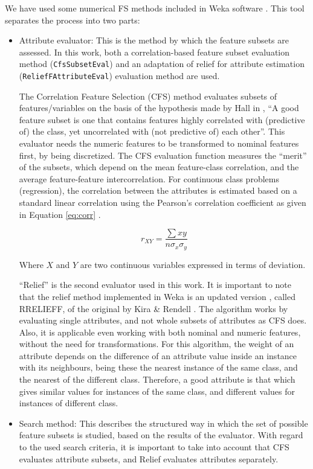 \documentclass[a4paper,10pt,twocolumn,preprint,3p]{elsarticle}
\begin{document}
We have used some numerical FS methods included in Weka software \cite{Hall2009,Witten2011}. This tool separates the process into two parts:

\begin{itemize}
  \item Attribute evaluator: This is the method by which the feature subsets are assessed. In this work, both a correlation-based feature subset evaluation method ({\tt CfsSubsetEval}) and an adaptation of relief for attribute estimation ({\tt ReliefFAttributeEval}) evaluation method are used. 
  
  The Correlation Feature Selection (CFS) method evaluates subsets of features/variables on the basis of the hypothesis made by Hall in \cite{Hall1998}, ``A  good  feature  subset  is  one  that  contains  features  highly  correlated  with
(predictive of) the class, yet uncorrelated with (not predictive of) each other''. This evaluator needs the numeric features to be transformed to nominal features first, by being discretized.%
 The CFS evaluation function measures the ``merit'' of the subsets, which depend on the mean feature-class correlation, and the average feature-feature intercorrelation. For continuous class problems (regression), the correlation between the attributes is estimated based on a standard linear correlation
using the Pearson's correlation coefficient as given in Equation \ref{eq:corr} \cite{hall2000correlation}. 

\begin{equation}
r_{XY}=\frac{\sum xy}{n\sigma_{x}\sigma_{y}}
\label{eq:corr}
\end{equation}


Where $X$ and $Y$ are two continuous variables expressed in terms
of deviation. 

``Relief'' is the second evaluator used in this work. It is important to note that the relief method implemented in Weka is an updated version \cite{RobnikSikonja1997}, called RRELIEFF, of the original by Kira \& Rendell \cite{Kira1992}. The algorithm works by evaluating single attributes, and not whole subsets of attributes as CFS does. Also, it is applicable even working with both nominal and numeric features, without the need for transformations. For this algorithm, the weight of an attribute depends on the difference of an attribute value inside an instance with its neighbours, being these the nearest instance of the same class, and the nearest of the different class. Therefore, a good attribute is that which gives similar values for instances of the same class, and different values for instances of different class.
  \item Search method: This describes the structured way in which the set of possible feature subsets is studied, based on the results of the evaluator. With regard to the used search criteria, it is important to take into account that CFS evaluates attribute subsets, and Relief evaluates attributes separately.


\end{itemize}
\end{document}
